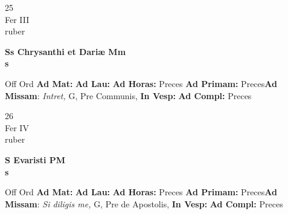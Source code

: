 \documentclass[10pt, openany]{book}
\begin{document}
    \begin{center}
        \begin{minipage}{3.5in}
            \vspace{2em}
            \begin{minipage}{0.5in}
                {\Huge 25} \\
                {\normalsize Fer III} \\
                {\normalsize ruber}
            \end{minipage}
            \begin{minipage}{3.0in}
                \textbf{ \large Ss Chrysanthi et Dariæ Mm \\
                \textnormal{\normalsize s}} \\ 
            \end{minipage}
            \begin{justify}Off Ord
                \textbf{Ad Mat: }
                \textbf{Ad Lau: }
                \textbf{Ad Horas: }Preces
                \textbf{Ad Primam: }Preces\textbf{Ad Missam}: \textit{Intret,} G, Pre Communis,  
                \textbf{In Vesp: }
                \textbf{Ad Compl: }Preces
            \end{justify}
        \end{minipage}
    \end{center}

    \begin{center}
        \begin{minipage}{3.5in}
            \vspace{2em}
            \begin{minipage}{0.5in}
                {\Huge 26} \\
                {\normalsize Fer IV} \\
                {\normalsize ruber}
            \end{minipage}
            \begin{minipage}{3.0in}
                \textbf{ \large S Evaristi PM \\
                \textnormal{\normalsize s}} \\ 
            \end{minipage}
            \begin{justify}Off Ord
                \textbf{Ad Mat: }
                \textbf{Ad Lau: }
                \textbf{Ad Horas: }Preces
                \textbf{Ad Primam: }Preces\textbf{Ad Missam}: \textit{Si diligis me,} G, Pre de Apostolis,  
                \textbf{In Vesp: }
                \textbf{Ad Compl: }Preces
            \end{justify}
        \end{minipage}
    \end{center}
\end{document}

